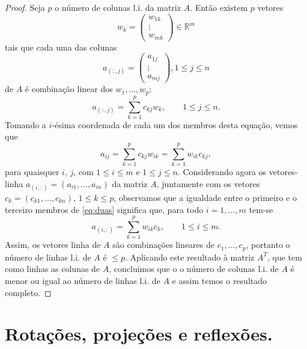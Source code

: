 \begin{proof}
Seja $p$ o número de colunas l.i. da matriz $A$. Então existem $p$ vetores 
\begin{equation*}
   w_k =\begin{pmatrix} w_{1k}\\\vdots\\w_{mk}\end{pmatrix} \in {\mathbb{R}}^m
\end{equation*}
 tais que cada uma das colunas 
\begin{equation*}
   a_{(:,j)}=\begin{pmatrix}a_{1j}\\\vdots\\a_{mj}\end{pmatrix}, 1\leq j \leq n
\end{equation*}
de $A$ é combinação linear dos $w_1,\ldots,w_p$:
\begin{equation*}
   a_{(:,j)} = \sum_{k=1}^p c_{kj}w_k, \qquad 1\leq j \leq n.
\end{equation*}
Tomando a $i$-ésima coordenada de cada um dos membros desta equação, vemos que
\begin{equation}\label{eq:duas}
   a_{ij} = \sum_{k=1}^p c_{kj}w_{ik}=\sum_{k=1}^p w_{ik}c_{kj},
\end{equation}
para quaisquer $i$, $j$, com $1\leq i \leq m$ e $1\leq j \leq n$. Considerando agora os vetores-linha $a_{(i,:)}=(a_{i1},\ldots,a_{in})$ da matriz $A$, juntamente com os vetores $c_k=(c_{k1},\ldots,c_{kn})$, $1\leq k\leq p$, observamos que a igualdade entre o primeiro e o terceiro membros de \eqref{eq:duas} significa que, para todo $i=1,\ldots,m$ tem-se 
\begin{equation*}
   a_{(i,:)} = \sum_{k=1}^p w_{ik} c_k, \qquad 1\leq i \leq m.
\end{equation*}
Assim, os vetores linha de $A$ são combinações lineares de $c_1,\ldots,c_p$, portanto o número de linhas l.i. de $A$ é $\leq p$. Aplicando este resultado à matriz $A^T$, que tem como linhas as colunas de $A$, concluimos que o o número de colunas l.i. de $A$ é menor ou igual ao número de linhas l.i. de $A$ e assim temos o resultado completo.
\end{proof}

\section{Rotações, projeções e reflexões.}

